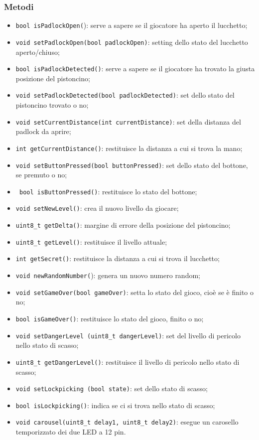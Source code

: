 \subsubsection{Metodi}
\begin{itemize}
	\item \texttt{bool isPadlockOpen(}): serve a sapere se il giocatore ha aperto il lucchetto;
	\item \texttt{void setPadlockOpen(bool padlockOpen)}: setting dello stato del lucchetto aperto/chiuso;
	\item \texttt{bool isPadlockDetected()}: serve a sapere se il giocatore ha trovato la giusta posizione del pistoncino;
	\item \texttt{void setPadlockDetected(bool padlockDetected)}: set dello stato del pistoncino trovato o no;
	\item \texttt{void setCurrentDistance(int currentDistance)}: set della distanza del padlock da aprire;
	\item \texttt{int getCurrentDistance()}: restituisce la distanza a cui si trova la mano;
	\item \texttt{void setButtonPressed(bool buttonPressed)}: set dello stato del bottone, se premuto o no;
	\item \texttt{ bool isButtonPressed()}: restituisce lo stato del bottone;
	\item \texttt{void setNewLevel()}: crea il nuovo livello da giocare;
	\item \texttt{uint8\_t getDelta()}: margine di errore della posizione del pistoncino;
	\item \texttt{uint8\_t getLevel()}: restituisce il livello attuale;
	\item \texttt{int getSecret()}: restituisce la distanza a cui si trova il lucchetto;
	\item \texttt{void newRandomNumber(}): genera un nuovo numero random;
	\item \texttt{void setGameOver(bool gameOver)}: setta lo stato del gioco, cioè se è finito o no;
	\item \texttt{bool isGameOver()}: restituisce lo stato del gioco, finito o no;
	\item \texttt{void setDangerLevel (uint8\_t dangerLevel)}:  set del livello di pericolo nello stato di scasso;
	\item \texttt{uint8\_t getDangerLevel()}: restituisce il livello di pericolo nello stato di scasso;
	\item \texttt{void setLockpicking (bool state)}: set dello stato di scasso;
	\item \texttt{bool isLockpicking()}: indica se ci si trova nello stato di scasso;
	\item \texttt{void carousel(uint8\_t delay1, uint8\_t delay2)}: esegue un carosello temporizzato dei due LED a 12 pin.
\end{itemize}
